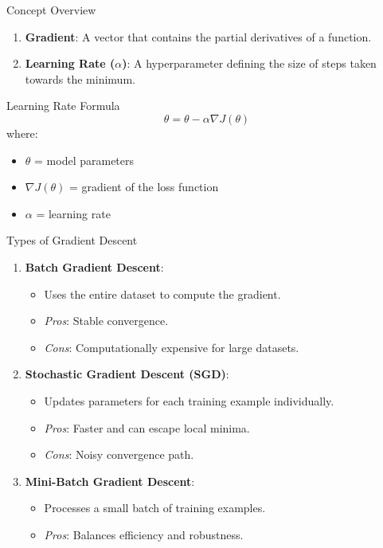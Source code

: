 \documentclass[aspectratio=169]{beamer}
\begin{document}
\begin{frame}[fragile]{Concept Overview}
    \begin{enumerate}
        \item \textbf{Gradient}: A vector that contains the partial derivatives of a function. 
        \item \textbf{Learning Rate ($\alpha$)}: A hyperparameter defining the size of steps taken towards the minimum.
    \end{enumerate}
    
    \begin{block}{Learning Rate Formula}
        \begin{equation}
        \theta = \theta - \alpha \nabla J(\theta)
        \end{equation}
        where:
        \begin{itemize}
            \item $\theta$ = model parameters
            \item $\nabla J(\theta)$ = gradient of the loss function
            \item $\alpha$ = learning rate
        \end{itemize}
    \end{block}
\end{frame}

\begin{frame}[fragile]{Types of Gradient Descent}
    \begin{enumerate}
        \item \textbf{Batch Gradient Descent}:
            \begin{itemize}
                \item Uses the entire dataset to compute the gradient.
                \item \textit{Pros}: Stable convergence.
                \item \textit{Cons}: Computationally expensive for large datasets.
            \end{itemize}

        \item \textbf{Stochastic Gradient Descent (SGD)}:
            \begin{itemize}
                \item Updates parameters for each training example individually.
                \item \textit{Pros}: Faster and can escape local minima.
                \item \textit{Cons}: Noisy convergence path.
            \end{itemize}

        \item \textbf{Mini-Batch Gradient Descent}:
            \begin{itemize}
                \item Processes a small batch of training examples.
                \item \textit{Pros}: Balances efficiency and robustness.
            \end{itemize}
    \end{enumerate}
\end{frame}
\end{document}
